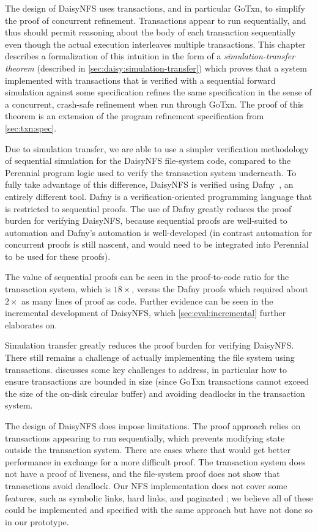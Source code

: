 The design of DaisyNFS uses transactions, and in particular GoTxn, to simplify
the proof of concurrent refinement. Transactions appear to run
sequentially, and thus should permit reasoning about the body of each
transaction sequentially even though the actual execution interleaves multiple
transactions. This chapter describes a formalization of this intuition in the
form of a \emph{simulation-transfer theorem} (described in
\cref{sec:daisy:simulation-transfer}) which proves that a system implemented
with transactions that is verified with a sequential forward simulation against
some specification refines the same specification in the sense of a concurrent,
crash-safe refinement when run through GoTxn. The proof of this theorem is an
extension of the program refinement specification from \cref{sec:txn:spec}.


Due to simulation transfer, we are able to use a simpler verification
methodology of sequential simulation for the DaisyNFS file-system code, compared
to the Perennial program logic used to verify the transaction system underneath.
To fully take advantage of this difference, DaisyNFS is verified using
Dafny~\cite{leino:dafny}, an entirely different tool. Dafny is a
verification-oriented programming language that is restricted to sequential
proofs. The use of Dafny greatly reduces the proof burden for verifying
DaisyNFS, because sequential proofs are well-suited to automation and Dafny's
automation is well-developed (in contrast automation for concurrent proofs is
still nascent, and would need to be integrated into Perennial to be used for
these proofs).

The value of sequential proofs can be seen in the proof-to-code ratio for the
transaction system, which is $18\times$, versus the Dafny proofs which required
about $2\times$ as many lines of proof as code. Further evidence can be seen in
the incremental development of DaisyNFS, which \cref{sec:eval:incremental}
further elaborates on.

Simulation transfer greatly reduces the proof burden for verifying DaisyNFS.
There still remains a challenge of actually implementing the file system using
transactions.  discusses some key challenges to address,
in particular how to ensure transactions are bounded in size (since GoTxn
transactions cannot exceed the size of the on-disk circular buffer) and avoiding
deadlocks in the transaction system.

The design of DaisyNFS does impose limitations. The proof approach relies on
transactions appearing to run sequentially, which prevents modifying state
outside the transaction system. There are cases where that would get better
performance in exchange for a more difficult proof. The transaction system does
not have a proof of liveness, and the file-system proof does not show that
transactions avoid deadlock. Our NFS implementation does not cover some
features, such as symbolic links, hard links, and paginated ; we
believe all of these could be implemented and specified with the same approach
but have not done so in our prototype.
